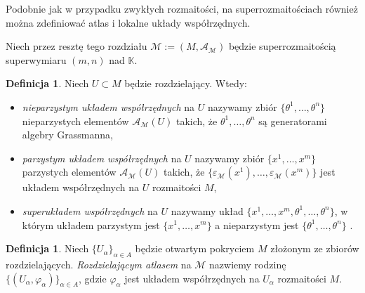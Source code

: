 \documentclass[11pt,a4paper]{report}
\theoremstyle{definition}
\newtheorem{definition}[theorem]{Definicja}
\begin{document}
Podobnie jak w przypadku zwykłych rozmaitości, na superrozmaitościach również można zdefiniować atlas i lokalne układy współrzędnych.

Niech przez resztę tego rozdziału $\mathcal{M} := (M,\mathcal{A}_\mathcal{M})$ będzie superrozmaitością superwymiaru $(m,n)$ nad $\mathbb{K}$.

\begin{definition}
	Niech $U \subset M$ będzie rozdzielający. Wtedy:
	\begin{itemize}
		\item {}\textit{nieparzystym układem współrzędnych} na $U$ nazywamy zbiór $\{\theta^1, \ldots, \theta^n \}$ nieparzystych elementów $\mathcal{A}_\mathcal{M} (U)$ takich, że $\theta^1, \ldots, \theta^n$ są generatorami algebry Grassmanna,
		\item {}\textit{parzystym układem współrzędnych} na $U$ nazywamy zbiór $\{x^1, \ldots, x^m \}$ parzystych elementów $\mathcal{A}_\mathcal{M} (U)$ takich, że $\{ \varepsilon_\mathcal{M} (x^1), \ldots, \varepsilon_\mathcal{M} (x^m) \}$ jest układem współrzędnych na $U$ rozmaitości $M$,
		\item {}\textit{superukładem współrzędnych} na $U$ nazywamy układ $\{x^1, \ldots, x^m, \theta^1, \ldots, \theta^n \}$, w którym układem parzystym jest $\{x^1, \ldots, x^m \}$ a nieparzystym jest $\{\theta^1, \ldots, \theta^n \}$ \cite{rogers}.
	\end{itemize}
\end{definition}

\begin{definition}
	Niech $\{ U_\alpha \}_{\alpha \in A}$ będzie otwartym pokryciem $M$ złożonym ze zbiorów rozdzielających. \textit{Rozdzielającym atlasem} na $\mathcal{M}$ nazwiemy rodzinę $\{ (U_\alpha, \varphi_\alpha) \}_{\alpha \in A}$, gdzie $\varphi_\alpha$ jest układem współrzędnych na $U_\alpha$ rozmaitości $M$.
\end{definition}
\end{document}
